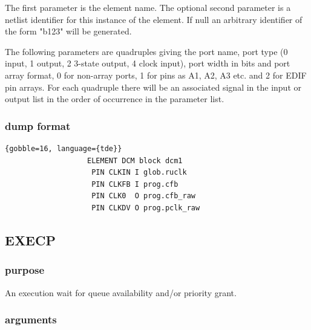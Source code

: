                 The first parameter is the element name. The optional second
                parameter is a netlist identifier for this instance of the
                element. If null an arbitrary identifier of the form "b123" will
                be generated.
                
                The following parameters are quadruples giving the port name,
                port type (0 input, 1 output, 2 3-state output, 4 clock input),
                port width in bits and port array format, 0 for non-array
                ports, 1 for pins as A1, A2, A3 etc. and 2 for EDIF pin arrays.
                For each quadruple there will be an associated signal in the
                input or output list in the order of occurrence in the
                parameter list.
            
            \subsubsection{dump format}
            
                \begin{lstlisting}{gobble=16, language={tde}}
                   ELEMENT DCM block dcm1
                    PIN CLKIN I glob.ruclk
                    PIN CLKFB I prog.cfb
                    PIN CLK0  O prog.cfb_raw
                    PIN CLKDV O prog.pclk_raw
                \end{lstlisting}


        \subsection{EXECP}

            \subsubsection{purpose}
            
                An execution wait for queue availability and/or priority grant.

            \subsubsection{arguments}
            
